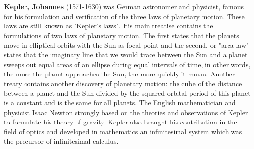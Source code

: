 {}
\textbf{Kepler, Johannes} (1571-1630) was German astronomer and physicist, famous for his formulation and verification of the three laws of planetary motion. These laws are still known as "Kepler's laws". His main treatise contains the formulations of two laws of planetary motion. The first states that the planets move in elliptical orbits with the Sun as focal point and the second, or "area law" states that the imaginary line that we would trace between the Sun and a planet sweeps out equal areas of an ellipse during equal intervals of time, in other words, the more the planet approaches the Sun, the more quickly it moves. Another treaty contains another discovery of planetary motion: the cube of the distance between a planet and the Sun divided by the squared orbital period of this planet is a constant and is the same for all planets. The English mathematician and physicist Isaac Newton strongly based on the theories and observations of Kepler to formulate his theory of gravity. Kepler also brought his contribution in the field of optics and developed in mathematics an infinitesimal system which was the precursor of infinitesimal calculus.


